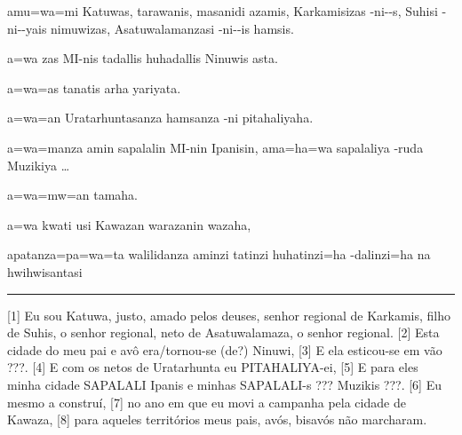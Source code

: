 \setcounter{parcount}{0}
\begin{parnumbersa}[]

	\raggedright%
	\itshape%

	amu=wa=mi Katuwas, tarawanis, masanidi azamis, Karkamisizas
	-ni--s,
	Suhisi -ni--yais nimuwizas,
	Asatuwalamanzasi -ni--is hamsis.

	a=wa zas MI-nis tadallis huhadallis Ninuwis asta.

	a=wa=as tanatis arha yariyata.

	a=wa=an Uratarhuntasanza hamsanza -ni pitahaliyaha.

	a=wa=manza amin sapalalin MI-nin Ipanisin, ama=ha=wa sapalaliya
	-ruda Muzikiya \ldots{}

	a=wa=mw=an tamaha.

	a=wa kwati usi Kawazan warazanin wazaha,


	apatanza=pa=wa=ta walilidanza aminzi tatinzi huhatinzi=ha -dalinzi=ha na hwihwisantasi


\end{parnumbersa}

\vspace{10pt}
\hrule
\vspace{10pt}

[1] Eu sou Katuwa, justo, amado pelos deuses, senhor regional de Karkamis, filho
de Suhis, o senhor regional, neto de Asatuwalamaza, o senhor regional.
	[2] Esta cidade do meu pai e avô era\slash{}tornou-se (de?) Ninuwi,
[3] E ela esticou-se em vão {???.}
[4] E com os netos de Uratarhunta eu PITAHALIYA-ei,
[5] E para eles minha cidade SAPALALI Ipanis e minhas SAPALALI-s {???} Muzikis {???}.
[6] Eu mesmo a construí,
[7] no ano em que eu movi a campanha pela cidade de Kawaza,
[8] para aqueles territórios meus pais, avós, bisavós não marcharam.

\clearpage

